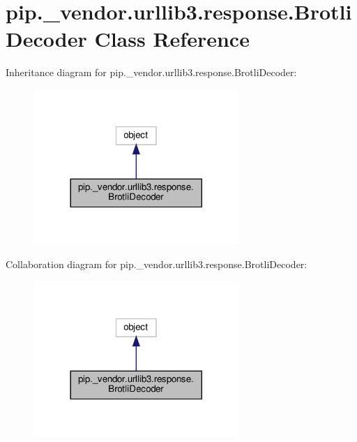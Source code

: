 \hypertarget{classpip_1_1__vendor_1_1urllib3_1_1response_1_1BrotliDecoder}{}\section{pip.\+\_\+vendor.\+urllib3.\+response.\+Brotli\+Decoder Class Reference}
\label{classpip_1_1__vendor_1_1urllib3_1_1response_1_1BrotliDecoder}


Inheritance diagram for pip.\+\_\+vendor.\+urllib3.\+response.\+Brotli\+Decoder\+:
\nopagebreak
\begin{figure}[H]
\begin{center}
\leavevmode
\includegraphics[width=221pt]{classpip_1_1__vendor_1_1urllib3_1_1response_1_1BrotliDecoder__inherit__graph}
\end{center}
\end{figure}


Collaboration diagram for pip.\+\_\+vendor.\+urllib3.\+response.\+Brotli\+Decoder\+:
\nopagebreak
\begin{figure}[H]
\begin{center}
\leavevmode
\includegraphics[width=221pt]{classpip_1_1__vendor_1_1urllib3_1_1response_1_1BrotliDecoder__coll__graph}
\end{center}
\end{figure}

